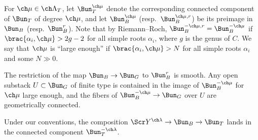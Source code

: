 For $\ch\mu\in \ch\Lambda_T$, let $\Bun^{\ch\mu}_T$ denote the corresponding
connected component of $\Bun_T$ of degree $\ch\mu$, and
let $\Bun^{\ch\mu}_B$ (resp.~$\Bun^{\ch\mu,r}_B$) be
its preimage in $\Bun_B$ (resp.~$\Bun^r_B$).
Note that by Riemann--Roch, $\Bun_B^{-\ch\mu,r} = \Bun_B^{-\ch\mu}$
if $\brac{\alpha_i,\ch\mu} > 2g-2$ for all simple roots $\alpha_i$, where $g$ is the genus of $C$. We say that $\ch\mu$ is ``large enough'' if $\brac{\alpha_i,\ch\mu}>N$
for all simple roots $\alpha_i$ and some $N \gg 0$.

\begin{lem}
\notready
\label{lem:BunBtoGsm}
The restriction of the map $\Bun_B \to \Bun_G$ to $\Bun^r_B$ is smooth.
Any open substack $U\subset \Bun_G$ of finite type is contained in the image of
$\Bun^{-\ch\mu}_B$ for $\ch\mu$ large enough, and the fibers of $\Bun^{-\ch\mu}_B\to \Bun_G$ over $U$ are geometrically connected.
\end{lem}

Under our conventions, the composition $\Scr Y^{\ch\lambda} \to \Bun_B \to \Bun_T$ lands in the connected component $\Bun_T^{-\ch\lambda}$.


